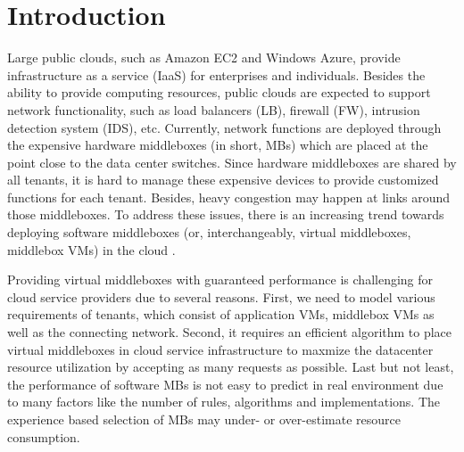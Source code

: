 \documentclass[review]{elsarticle}
\begin{document}
\section{Introduction}
Large public clouds, such as Amazon EC2 and Windows Azure, provide infrastructure as a service (IaaS) for enterprises and individuals. Besides the ability to provide computing resources, public clouds are expected to support network functionality, such as load balancers (LB), firewall (FW), intrusion detection system (IDS), etc. Currently, network functions are deployed through the expensive hardware middleboxes (in short, MBs) which are placed at the point close to the data center switches. %
Since hardware middleboxes are shared by all tenants, it is hard to manage these expensive devices to provide customized functions for each tenant. Besides, heavy congestion may happen at links around those middleboxes. To address these issues, there is an increasing trend towards deploying 
 software middleboxes (or, interchangeably, virtual middleboxes, middlebox VMs) in the cloud \cite{G13dio, stratos12}. %


Providing virtual middleboxes with guaranteed performance is challenging for cloud service providers due to several reasons. First, we need to model various requirements of tenants, which consist of application VMs, middlebox VMs as well as the connecting network. Second, it requires an efficient algorithm to  place virtual middleboxes in cloud service infrastructure to maxmize the datacenter resource utilization by accepting as many requests as possible. Last but not least, 
the performance of software MBs is not easy to predict in real environment due to many factors like the number of rules, algorithms and implementations. The experience based selection of MBs may under- or over-estimate resource consumption.  
\end{document}
